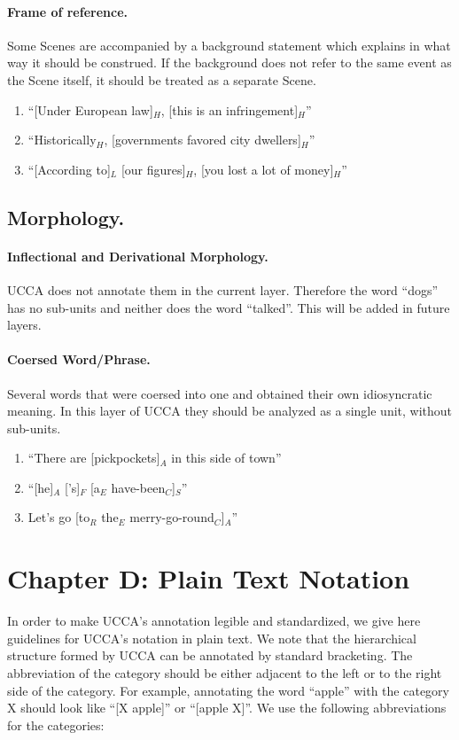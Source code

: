 \documentclass[11pt]{article}
\newcommand{\be}{\begin{enumerate}}
\newcommand{\ee}{\end{enumerate}}
\begin{document}
\paragraph{Frame of reference.} Some Scenes are accompanied by a background statement which explains in what way it should be construed. If the background does not refer to the same event as the Scene itself, it should be treated as a separate Scene.
\be \item
``[Under European law]$_H$, [this is an infringement]$_H$''
\item
``Historically$_H$, [governments favored city dwellers]$_H$''
\item
``[According to]$_L$ [our figures]$_H$, [you lost a lot of money]$_H$''
\ee

\subsection{Morphology.}

\paragraph{Inflectional and Derivational Morphology.} UCCA does not annotate them in the current layer. Therefore the word ``dogs'' has no sub-units and neither does the word ``talked''. This will be added in future layers.

\paragraph{Coersed Word/Phrase.}
Several words that were coersed into one and obtained their own idiosyncratic meaning. In this layer of UCCA they should be analyzed as a single unit, without sub-units.
\be \item
``There are [pickpockets]$_A$ in this side of town''
\item
``[he]$_A$ ['s]$_F$ [a$_E$ have-been$_C$]$_S$''
\item
Let's go [to$_R$ the$_E$ merry-go-round$_C$]$_A$''
\ee

\section{Chapter D: Plain Text Notation}


In order to make UCCA's annotation legible and standardized, we give here guidelines for UCCA's notation in plain text. We note that the hierarchical structure formed by UCCA can be annotated by standard bracketing. The abbreviation of the category should be either adjacent to the left or to the right side of the category.
For example, annotating the word ``apple'' with the category X should look like ``[X apple]'' or ``[apple X]''.
We use the following abbreviations for the categories:\\
\end{document}
